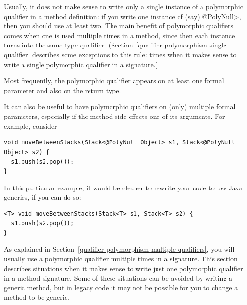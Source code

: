 

Usually, it does not make sense to write only a single instance of a polymorphic
qualifier in a method definition:  if you write one instance of (say)
\<@PolyNull>, then you should use at least two.
The main benefit of polymorphic qualifiers comes when one is used multiple times
in a method, since then each instance turns into the same type qualifier.
(Section~\ref{qualifier-polymorphism-single-qualifier} describes some
exceptions to this rule:  times when it makes sense to write a single
polymorphic qualifier in a signature.)

Most frequently, the polymorphic qualifier appears on at least one formal
parameter and also on the return type.



  It can also be useful to have
polymorphic qualifiers on (only) multiple formal parameters, especially if
the method side-effects one of its arguments.
For example, consider

\begin{Verbatim}
void moveBetweenStacks(Stack<@PolyNull Object> s1, Stack<@PolyNull Object> s2) {
  s1.push(s2.pop());
}
\end{Verbatim}

\noindent
In this particular example, it would be cleaner to rewrite your code to use
Java generics, if you can do so:

\begin{Verbatim}
<T> void moveBetweenStacks(Stack<T> s1, Stack<T> s2) {
  s1.push(s2.pop());
}
\end{Verbatim}



As explained in Section~\ref{qualifier-polymorphism-multiple-qualifiers},
you will usually use a polymorphic qualifier
multiple times in a signature.
This section describes situations when it makes sense to write just one
polymorphic qualifier in a method signature.
Some of these situations can be avoided by writing a generic method,
but in legacy code it may not be possible for you to change a method to be
generic.


